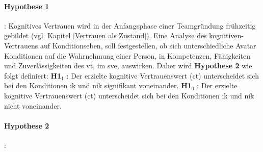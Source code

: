 \documentclass[a4paper,11pt]{article}%
\renewcommand{\\}{\vspace*{0.5\baselineskip} \newline}
\begin{document}
\paragraph{Hypothese 1}:
Kognitives Vertrauen wird in der Anfangsphase einer Teamgründung frühzeitig gebildet (vgl. Kapitel \ref{Vertrauen als Zustand}).
Eine Analyse des kognitiven-Vertrauens auf Konditionseben, soll festgestellen, ob sich unterschiedliche Avatar Konditionen auf die Wahrnehmung einer Person, in Kompetenzen, Fähigkeiten und Zuverlässigkeiten des \ac{vt}, im \ac{sve}, auswirken.
Daher wird \textbf{Hypothese 2} wie folgt definiert:\\
\textbf{H1$_{1}$} : Der erzielte kognitive Vertrauenswert (\ac{ct}) unterscheidet sich bei den Konditionen \ac{ik} und \ac{nik} signifikant voneinander. \newline
\textbf{H1$_{0}$} : Der erzielte kognitive Vertrauenswert (\ac{ct}) unterscheidet sich bei den Konditionen \ac{ik} und \ac{nik} nicht voneinander. \\


\paragraph{Hypothese 2}:
\end{document}
